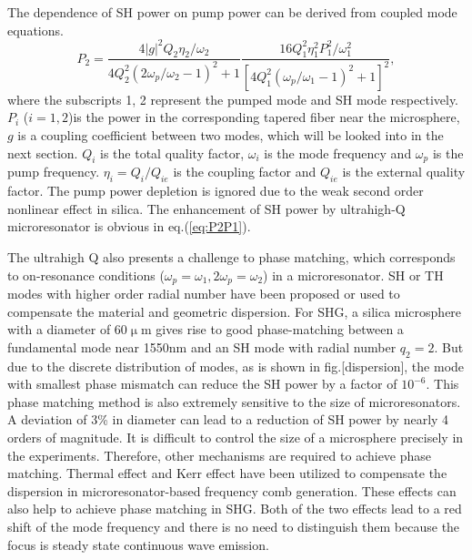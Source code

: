 \documentclass[a4paper,12pt,hyperref]{article}
\begin{document}
The dependence of SH power on pump power can be derived from coupled mode equations\cite{haus1991coupled}.
\begin{equation}
P_2 = \frac{4|g|^2Q_2\eta_2/\omega_2}{4Q_2^2(2\omega_p/\omega_2-1)^2+1}\frac{16Q_1^2\eta_1^2P_1^2/\omega_1^2}{[4Q_1^2(\omega_p/\omega_1-1)^2+1]^2},
\label{eq:P2P1}
\end{equation}
where the subscripts 1, 2 represent the pumped mode and SH mode respectively. $P_i$ ($i=1, 2$)is the power in the corresponding tapered fiber near the microsphere, $g$ is a coupling coefficient between two modes, which will be looked into in the next section. $Q_i$ is the total quality factor, $\omega_i$ is the mode frequency and $\omega_p$ is the pump frequency. $\eta_{i}=Q_i/Q_{ie}$ is the coupling factor and $Q_{ie}$ is the external quality factor. The pump power depletion is ignored due to the weak second order nonlinear effect in silica. The enhancement of SH power by ultrahigh-Q microresonator is obvious in eq.(\ref{eq:P2P1}). 

The ultrahigh Q also presents a challenge to phase matching, which corresponds to on-resonance conditions ($\omega_p = \omega_1, 2\omega_p = \omega_2$) in a microresonator\cite{carmon2007visible, kozyreff2008whispering, xu2008second, farnesi2014optical}. SH or TH modes with higher order radial number have been proposed or used to compensate the material and geometric dispersion\cite{carmon2007visible, kozyreff2008whispering, farnesi2014optical}. For SHG, a silica microsphere with a diameter of 60$\upmu$m gives rise to good phase-matching between a fundamental mode near 1550nm and an SH mode with radial number $q_2=2$. But due to the discrete distribution of modes, as is shown in fig.[dispersion], the mode with smallest phase mismatch can reduce the SH power by a factor of $10^{-6}$. This phase matching method is also extremely sensitive to the size of microresonators. A deviation of 3\% in diameter can lead to a reduction of SH power by nearly 4 orders of magnitude. It is difficult to control the size of a microsphere precisely in the experiments. Therefore, other mechanisms are required to achieve phase matching. Thermal effect and Kerr effect have been utilized to compensate the dispersion in microresonator-based frequency comb generation\cite{del2011octave, herr2014temporal}. These effects can also help to achieve phase matching in SHG. Both of the two effects lead to a red shift of the mode frequency \cite{ilchenko1992thermal, treussart1998evidence,  carmon2004dynamical, fomin2005nonstationary} and there is no need to distinguish them because the focus is steady state continuous wave emission. 
\end{document}
